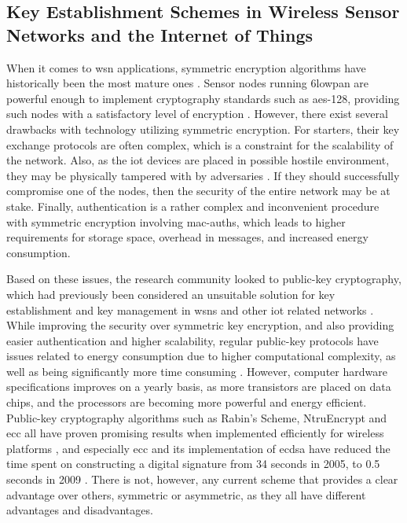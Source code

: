 

\subsection{Key Establishment Schemes in Wireless Sensor Networks and the Internet of Things}

When it comes to \gls{wsn} applications, symmetric encryption algorithms have historically been the most mature ones \citep{Jing2014}. Sensor nodes running \gls{6lowpan} are powerful enough to implement cryptography standards such as \gls{aes}-128, providing such nodes with a satisfactory level of encryption \cite{Roman2011147}. However, there exist several drawbacks with technology utilizing symmetric encryption. For starters, their key exchange protocols are often complex, which is a constraint for the scalability of the network. Also, as the \gls{iot} devices are placed in possible hostile environment, they may be physically tampered with by adversaries \cite{krentz20136lowpan}. If they should successfully compromise one of the nodes, then the security of the entire network may be at stake. Finally, authentication is a rather complex and inconvenient procedure with symmetric encryption involving \gls{mac-auth}s, which leads to higher requirements for storage space, overhead in messages, and increased energy consumption.

Based on these issues, the research community looked to public-key cryptography, which had previously been considered  an unsuitable solution for key establishment and key management in \gls{wsn}s and other \gls{iot} related networks \cite{gaubatz2004public, wander2005energy}. While improving the security over symmetric key encryption, and also providing easier authentication and higher scalability, regular public-key protocols have issues related to energy consumption due to higher computational complexity, as well as being significantly more time consuming \cite{Eschenauer2002}. However, computer hardware specifications improves on a yearly basis, as more transistors are placed on data chips, and the processors are becoming more powerful and energy efficient. Public-key cryptography algorithms such as Rabin's Scheme, NtruEncrypt and \gls{ecc} all have proven promising results when implemented efficiently for wireless platforms \cite{Jing2014}, and especially \gls{ecc} and its implementation of \gls{ecdsa} have reduced the time spent on constructing a digital signature from 34 seconds in 2005, to 0.5 seconds in 2009 \cite{Roman2011147}. There is not, however, any current scheme that provides a clear advantage over others, symmetric or asymmetric, as they all have different advantages and disadvantages. 

